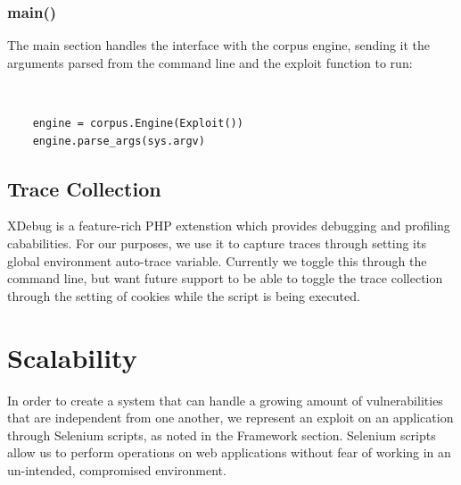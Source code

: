 \documentclass[letterpaper,twocolumn,10pt]{article}
\begin{document}
\subsubsection{main()}

The main section handles the interface with the corpus engine, sending it the arguments parsed from the command line and the exploit function to run:

{\tt
\begin{verbatim}
    engine = corpus.Engine(Exploit())
    engine.parse_args(sys.argv)
\end{verbatim}

}


\subsection{Trace Collection}

XDebug is a feature-rich PHP extenstion which provides debugging and profiling cababilities.  For our purposes, we use it to capture traces through setting its global environment auto-trace variable.  Currently we toggle this through the command line, but want future support to be able to toggle the trace collection through the setting of cookies while the script is being executed.

\section{Scalability}
In order to create a system that can handle a growing amount of vulnerabilities that are independent from one another, we represent an exploit on an application through  Selenium scripts, as noted in the Framework section.  Selenium scripts allow us to perform operations on web applications without fear of working in an un-intended, compromised environment. 
\end{document}
